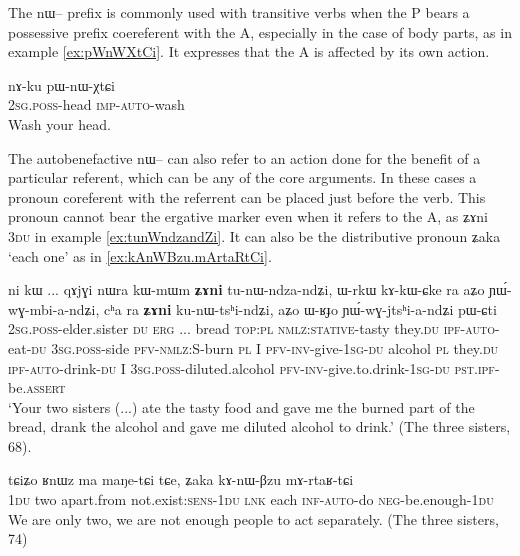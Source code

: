 \documentclass[oldfontcommands,oneside,a4paper,11pt]{article}
\newcommand{\ipa}[1]{{\phon \mbox{#1}}} %
\begin{document}
The \ipa{nɯ--} prefix is commonly used with transitive verbs when the P bears a possessive prefix coereferent with the A, especially in the case of body parts, as in example \ref{ex:pWnWXtCi}. It expresses that the A is affected by its own action.

\begin{exe}
\ex \label{ex:pWnWXtCi}
\gll 
\ipa{nɤ-ku} 	\ipa{pɯ-nɯ-χtɕi} \\
\textsc{2sg.poss}-head \textsc{imp-auto}-wash \\
\glt Wash your head.
\end{exe}

The autobenefactive \ipa{nɯ--} can also refer to an action done for the benefit of a particular referent, which can be any of the core arguments. In these cases a pronoun coreferent with the referrent can be placed just before the verb. This pronoun cannot bear the ergative marker even when it refers to the A, as \ipa{ʑɤni} \textsc{3du} in example \ref{ex:tunWndzandZi}. It can also be the distributive pronoun \ipa{ʑaka} `each one' as in \ref{ex:kAnWBzu.mArtaRtCi}.

   \begin{exe}
\ex \label{ex:tunWndzandZi}
\gll  \ipa{nɤ-pi}   	\ipa{ni}   	\ipa{kɯ}   	...   	\ipa{qɤjɣi}   	\ipa{nɯra}   	\ipa{kɯ-mɯm}   	\textbf{\ipa{ʑɤni}}   	\ipa{tu-nɯ-ndza-ndʑi,}   	\ipa{ɯ-rkɯ}   	\ipa{kɤ-kɯ-ɕke}   	\ipa{ra}   	\ipa{aʑo}   	\ipa{ɲɯ́-wɣ-mbi-a-ndʑi,}   	\ipa{cʰa}   	\ipa{ra}   	\textbf{\ipa{ʑɤni}}   	\ipa{ku-nɯ-tsʰi-ndʑi,}   	\ipa{aʑo}   	\ipa{ɯ-ʁɟo}   	\ipa{ɲɯ́-wɣ-jtsʰi-a-ndʑi}   	\ipa{pɯ-ɕti}        \\
\textsc{2sg.poss}-elder.sister \textsc{du} \textsc{erg} ... bread \textsc{top:pl} \textsc{nmlz:stative}-tasty they.\textsc{du} \textsc{ipf}-\textsc{auto}-eat-\textsc{du} \textsc{3sg.poss}-side \textsc{pfv}-\textsc{nmlz:S}-burn \textsc{pl}  I \textsc{pfv}-\textsc{inv}-give-\textsc{1sg}-\textsc{du} alcohol \textsc{pl} they.\textsc{du} \textsc{ipf}-\textsc{auto}-drink-\textsc{du} I \textsc{3sg.poss}-diluted.alcohol \textsc{pfv}-\textsc{inv}-give.to.drink-\textsc{1sg}-\textsc{du} \textsc{pst.ipf}-be.\textsc{assert}  \\
 \glt    `Your two sisters (...) ate the tasty food and gave me the burned part of the bread, drank the alcohol and gave me diluted alcohol to drink.'  (The three sisters, 68).
\end{exe} 



   \begin{exe}
\ex \label{ex:kAnWBzu.mArtaRtCi}
\gll
\ipa{tɕiʑo} 	\ipa{ʁnɯz} 	\ipa{ma} 	\ipa{maŋe-tɕi} 	\ipa{tɕe,} 	\ipa{ʑaka} 	\ipa{kɤ-nɯ-βzu} 	\ipa{mɤ-rtaʁ-tɕi} \\
\textsc{1du} two apart.from not.exist:\textsc{sens}-\textsc{1du} \textsc{lnk} each \textsc{inf-auto}-do \textsc{neg}-be.enough-\textsc{1du} \\
\glt We are only two, we are not enough people to act separately. (The three sisters, 74)
\end{exe} 
\end{document}
